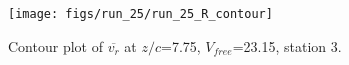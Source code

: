 \begin{figure}[H]
\centering
\texttt{[image: figs/run\_25/run\_25\_R\_contour]}
\caption{Contour plot of $\overline{v_{r}}$ at $z/c$=7.75, $V_{free}$=23.15, station 3.}
\label{fig:run_25_R_contour}
\end{figure}



